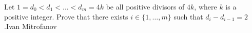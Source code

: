Let $1 = d_0 < d_1 < \dots < d_m = 4k$ be all positive divisors of $4k$,  where $k$ is a positive integer. Prove that there exists $i \in \{1, \dots, m\}$ such that $d_i - d_{i-1} = 2$.Ivan Mitrofanov